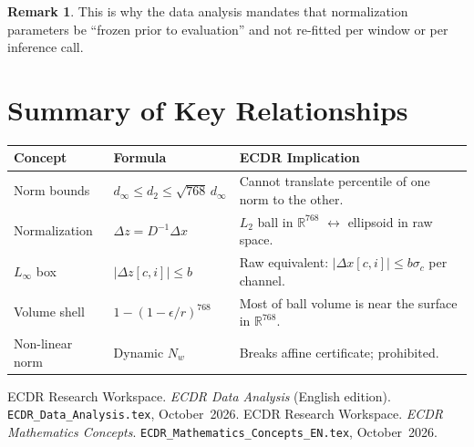 \documentclass[11pt, a4paper]{article}
\theoremstyle{definition}
\newtheorem{remark}{Remark}[section]
\theoremstyle{plain}
\newcommand{\R}{\mathbb{R}}
\newcommand{\code}[1]{\texttt{#1}}
\begin{document}
\begin{remark}
  This is why the data analysis mandates that normalization parameters be
  ``frozen prior to evaluation'' and not re-fitted per window or per inference call.
\end{remark}

\section{Summary of Key Relationships}

\begin{center}
\small
\begin{tabularx}{\linewidth}{@{}lYY@{}}
\toprule
Concept & Formula & ECDR Implication \\
\midrule
Norm bounds & $d_\infty \le d_2 \le \sqrt{768}\,d_\infty$ & Cannot translate percentile of one norm to the other. \\
Normalization & $\Delta z = D^{-1} \Delta x$ & $L_2$ ball in $\R^{768}$ $\leftrightarrow$ ellipsoid in raw space. \\
$L_\infty$ box & $|\Delta z[c,i]| \le b$ & Raw equivalent: $|\Delta x[c,i]| \le b \sigma_c$ per channel. \\
Volume shell & $1-(1-\epsilon/r)^{768}$ & Most of ball volume is near the surface in $\R^{768}$. \\
Non-linear norm & Dynamic $N_w$ & Breaks affine certificate; prohibited. \\
\bottomrule
\end{tabularx}
\end{center}

\begin{thebibliography}{9}
  ECDR Research Workspace. \textit{ECDR Data Analysis} (English edition).
  \code{ECDR\_Data\_Analysis.tex}, October~2026.
  ECDR Research Workspace. \textit{ECDR Mathematics Concepts}.
  \code{ECDR\_Mathematics\_Concepts\_EN.tex}, October~2026.
\end{thebibliography}
\end{document}
